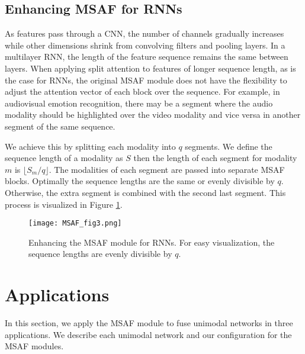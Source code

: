 \documentclass[10pt,twocolumn,letterpaper]{article}
\begin{document}
\subsection{Enhancing MSAF for RNNs}
As features pass through a CNN, the number of channels gradually increases while other dimensions shrink from convolving filters and pooling layers. In a multilayer RNN, the length of the feature sequence remains the same between layers. When applying split attention to features of longer sequence length, as is the case for RNNs, the original MSAF module does not have the flexibility to adjust the attention vector of each block over the sequence. For example, in audiovisual emotion recognition, there may be a segment where the audio modality should be highlighted over the video modality and vice versa in another segment of the same sequence.

We achieve this by splitting each modality into $q$ segments. We define the sequence length of a modality as $S$ then the length of each segment for modality $m$ is $\lfloor S_m/q \rfloor$. The modalities of each segment are passed into separate MSAF blocks. Optimally the sequence lengths are the same or evenly divisible by $q$. Otherwise, the extra segment is combined with the second last segment. This process is visualized in Figure \ref{fig3}.

\begin{figure}[t]
\centering
\texttt{[image: MSAF\_fig3.png]} \caption{Enhancing the MSAF module for RNNs. For easy visualization, the sequence lengths are evenly divisible by $q$.}
\label{fig3}
\end{figure}

\section{Applications}
In this section, we apply the MSAF module to fuse unimodal networks in three applications. We describe each unimodal network and our configuration for the MSAF modules.
\end{document}
